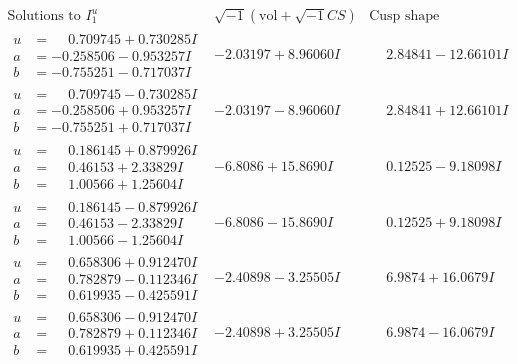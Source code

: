 \documentclass[1p]{elsarticle_modified}
\theoremstyle{definition}
\newcommand{\I}{\sqrt{-1}}
\begin{document}
$$\begin{array}{c|c|c}  
\text{Solutions to }I^u_{1}& \I (\text{vol} + \sqrt{-1}CS) & \text{Cusp shape}\\
 \hline 
\begin{aligned}
u &= \phantom{-}0.709745 + 0.730285 I \\
a &= -0.258506 - 0.953257 I \\
b &= -0.755251 - 0.717037 I\end{aligned}
 & -2.03197 + 8.96060 I & \phantom{-}2.84841 - 12.66101 I \\ \hline\begin{aligned}
u &= \phantom{-}0.709745 - 0.730285 I \\
a &= -0.258506 + 0.953257 I \\
b &= -0.755251 + 0.717037 I\end{aligned}
 & -2.03197 - 8.96060 I & \phantom{-}2.84841 + 12.66101 I \\ \hline\begin{aligned}
u &= \phantom{-}0.186145 + 0.879926 I \\
a &= \phantom{-}0.46153 + 2.33829 I \\
b &= \phantom{-}1.00566 + 1.25604 I\end{aligned}
 & -6.8086 + 15.8690 I & \phantom{-}0.12525 - 9.18098 I \\ \hline\begin{aligned}
u &= \phantom{-}0.186145 - 0.879926 I \\
a &= \phantom{-}0.46153 - 2.33829 I \\
b &= \phantom{-}1.00566 - 1.25604 I\end{aligned}
 & -6.8086 - 15.8690 I & \phantom{-}0.12525 + 9.18098 I \\ \hline\begin{aligned}
u &= \phantom{-}0.658306 + 0.912470 I \\
a &= \phantom{-}0.782879 - 0.112346 I \\
b &= \phantom{-}0.619935 - 0.425591 I\end{aligned}
 & -2.40898 - 3.25505 I & \phantom{-}6.9874 + 16.0679 I \\ \hline\begin{aligned}
u &= \phantom{-}0.658306 - 0.912470 I \\
a &= \phantom{-}0.782879 + 0.112346 I \\
b &= \phantom{-}0.619935 + 0.425591 I\end{aligned}
 & -2.40898 + 3.25505 I & \phantom{-}6.9874 - 16.0679 I \\ \hline\begin{aligned}

\end{aligned}
\end{array}$$
\end{document}
